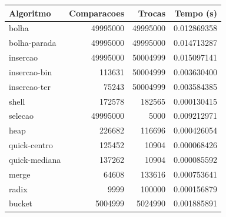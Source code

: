 \begin{tabular}{lrrr}
\hline
Algoritmo & Comparacoes & Trocas & Tempo (s) \\
\hline
bolha & 49995000 & 49995000 & 0.012869358 \\
bolha-parada & 49995000 & 49995000 & 0.014713287 \\
insercao & 49995000 & 50004999 & 0.015097141 \\
insercao-bin & 113631 & 50004999 & 0.003630400 \\
insercao-ter & 75243 & 50004999 & 0.003584385 \\
shell & 172578 & 182565 & 0.000130415 \\
selecao & 49995000 & 5000 & 0.009212971 \\
heap & 226682 & 116696 & 0.000426054 \\
quick-centro & 125452 & 10904 & 0.000068426 \\
quick-mediana & 137262 & 10904 & 0.000085592 \\
merge & 64608 & 133616 & 0.000753641 \\
radix & 9999 & 100000 & 0.000156879 \\
bucket & 5004999 & 5024990 & 0.001885891 \\
\hline
\end{tabular}
